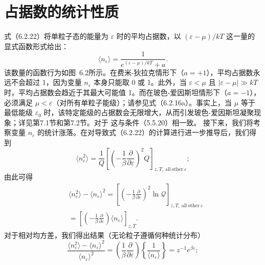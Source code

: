 \section{占据数的统计性质}\label{ux503eux5411ux6570ux7684ux7edfux8ba1ux6027ux8d28}
式（6.2.22）将单粒子态的能量为 \(\varepsilon\) 时的平均占据数，以 \((\varepsilon - \mu)/kT\) 这一量的显式函数形式给出：
\begin{equation}\tag{6.3.1}\label{eq:6.3.1}
\langle n _ { \varepsilon } \rangle = \frac { 1 } { e ^{( \varepsilon - \mu ) / k T} + a } .
\end{equation}
该数量的函数行为如图~6.2所示。在费米-狄拉克情形下（\(a=+1\)），平均占据数永远不会超过 1，因为变量 \(n_{\varepsilon}\) 本身只能取 0 或 1。此外，当 \(\varepsilon<\mu\) 且 \(|\varepsilon-\mu|\gg kT\) 时，平均占据数会趋近于其最大可能值 1。而在玻色-爱因斯坦情形下（\(a=-1\)），必须满足 \(\mu < \varepsilon\)（对所有单粒子能级）；请参见式（6.2.16a）。事实上，当 \(\mu\) 等于最低能级 \(\varepsilon_0\) 时，该特定能级的占据数会无限增大，从而引发玻色-爱因斯坦凝聚现象；详见第7.1节和第7.2节。对于
这与条件（5.5.20）相一致。
接下来，我们将考察变量 \(n_{\varepsilon}\) 的统计涨落。在对导致式（6.2.22）的计算进行进一步推导后，我们得到
\begin{equation}\tag{6.3.2}\label{eq:6.3.2}
\langle n _ { \varepsilon } ^{2} \rangle = \frac { 1 } { Q } \left[ \left( - \frac { 1 } { \beta } \frac { \partial } { \partial \varepsilon } \right) ^{2} Q \right] _ { z , T , \mathrm { ~ a l l ~ o t h e r ~ } \varepsilon } ;
\end{equation}
由此可得
\begin{equation}\tag{6.3.3}\label{eq:6.3.3}
\begin{array}{rl} & { \langle n _ { \varepsilon } ^{2} \rangle - \langle n _ { \varepsilon } \rangle ^{2} = \left[ \left( - \frac { 1 } { \beta } \frac { \partial } { \partial \varepsilon } \right) ^{2} \ln \mathcal { Q } \right] _ { z , T , \mathrm { ~ a l l ~ o t h e r ~ } \varepsilon } } \\& {  = \left[ \left( - \frac { 1 } { \beta } \frac { \partial } { \partial \varepsilon } \right) \langle n _ { \varepsilon } \rangle \right] _ { z , T } . } \end{array}
\end{equation}
对于相对均方差，我们得出结果（无论粒子遵循何种统计分布）
\begin{equation}\tag{6.3.4}\label{eq:6.3.4}
\frac { \langle n _ { \varepsilon } ^{2} \rangle - \langle n _ { \varepsilon } \rangle ^{2} } { \langle n _ { \varepsilon } \rangle ^{2} } = \left( \frac { 1 } { \beta } \frac { \partial } { \partial \varepsilon } \right) \left\{ \frac { 1 } { \langle n _ { \varepsilon } \rangle } \right\} = z ^{- 1} e ^{\beta \varepsilon} ;
\end{equation}
